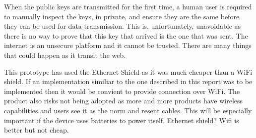 When the public keys are transmitted for the first time, a human user is required to manually inspect the keys, in private, and ensure they are the same before they can be used for data transmission. This is, unfortunately, unavoidable as there is no way to prove that this key that arrived is the one that was sent. The internet is an unsecure platform and it cannot be trusted. There are many things that could happen as it transit the web. 

This prototype has used the Ethernet Shield as it was much cheaper than a WiFi shield. If an implementation similiar to the one described in this report was to be implemented then it would be convient to provide connection over WiFi. The product also risks not being adopted as more and more products have wireless capabilities and  users see it as the norm and resent cables. This will be especially important if the device uses batteries to power itself.
Ethernet shield? Wifi is better but not cheap.
